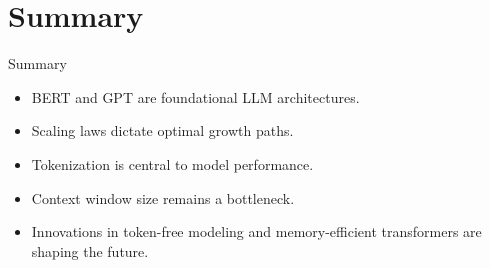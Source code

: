 \section{Summary}
\begin{frame}{Summary}
    \begin{itemize}
        \item BERT and GPT are foundational LLM architectures.
        \item Scaling laws dictate optimal growth paths.
        \item Tokenization is central to model performance.
        \item Context window size remains a bottleneck.
        \item Innovations in token-free modeling and memory-efficient transformers are shaping the future.
    \end{itemize}
\end{frame}